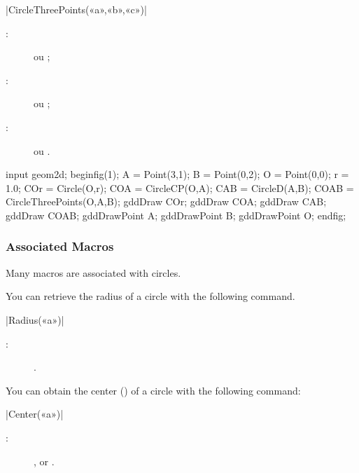 \documentclass[a4paper,english]{article}
\begin{document}
\begin{colourband}
\macro|CircleThreePoints(«a»,«b»,«c»)|
\begin{description}
  \item[:]   ou  ;
  \item[:]   ou  ;
  \item[:]   ou .
\end{description}
\end{colourband}
\bigskip



\begin{ExempleMP}
input geom2d;
beginfig(1);
A = Point(3,1);
B = Point(0,2);
O = Point(0,0);
r = 1.0;
COr = Circle(O,r);
COA = CircleCP(O,A);
CAB = CircleD(A,B);
COAB = CircleThreePoints(O,A,B);
gddDraw COr;
gddDraw COA;
gddDraw CAB;
gddDraw COAB;
gddDrawPoint A; gddDrawPoint B; gddDrawPoint O;
endfig;
\end{ExempleMP}

\subsubsection{Associated Macros}

Many macros are associated with circles.

You can retrieve the radius of a circle with the following command.

\begin{colourband}
\macro|Radius(«a»)|
\begin{description}
  \item[:]  .
\end{description}
\end{colourband}
\bigskip

You can obtain the center () of a circle with the following command:
\begin{colourband}
\macro|Center(«a»)|
\begin{description}
  \item[:]  ,  or .
\end{description}
\end{colourband}
\bigskip
\end{document}

